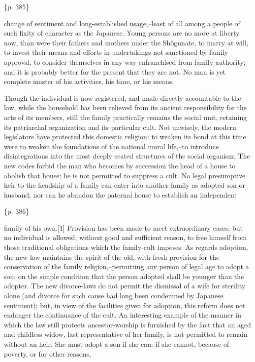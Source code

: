 \{p. 385\}

change of sentiment and long-established usage,--least of all among a people of such fixity of character as the Japanese. Young persons are no more at liberty now, than were their fathers and mothers under the Shôgunate, to marry at will, to invest their means and efforts in undertakings not sanctioned by family approval, to consider themselves in any way enfranchised from family authority; and it is probably better for the present that they are not. No man is yet complete master of his activities, his time, or his means.



Though the individual is now registered, and made directly accountable to the law, while the household has been relieved from its ancient responsibility for the acts of its members, still the family practically remains the social unit, retaining its patriarchal organization and its particular cult. Not unwisely, the modern legislators have protected this domestic religion: to weaken its bond at this time were to weaken the foundations of the national moral life,--to introduce disintegrations into the most deeply seated structures of the social organism. The new codes forbid the man who becomes by succession the head of a house to abolish that house: he is not permitted to suppress a cult. No legal presumptive heir to the headship of a family can enter into another family as adopted son or husband; nor can he abandon the paternal house to establish an independent

\{p. 386\}

family of his own.[1] Provision has been made to meet extraordinary cases; but no individual is allowed, without good and sufficient reason, to free himself from those traditional obligations which the family-cult imposes. As regards adoption, the new law maintains the spirit of the old, with fresh provision for the conservation of the family religion,--permitting any person of legal age to adopt a son, on the simple condition that the person adopted shall be younger than the adopter. The new divorce-laws do not permit the dismissal of a wife for sterility alone (and divorce for such cause had long been condemned by Japanese sentiment); but, in view of the facilities given for adoption, this reform does not endanger the continuance of the cult. An interesting example of the manner in which the law still protects ancestor-worship is furnished by the fact that an aged and childless widow, last representative of her family, is not permitted to remain without an heir. She must adopt a son if she can: if she cannot, because of poverty, or for other reasons,

